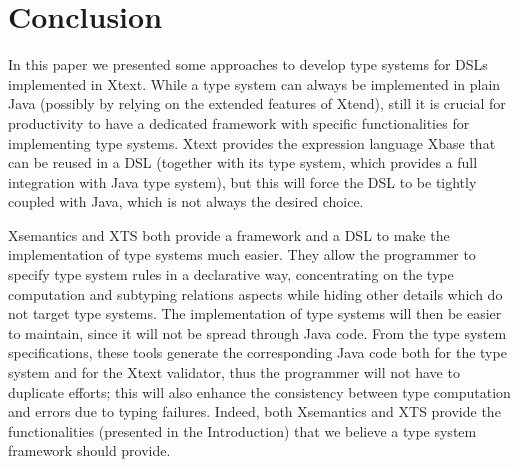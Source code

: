 \section{Conclusion}
\label{sec:conclusion}

In this paper we presented some approaches to develop type systems for DSLs
implemented in Xtext.  While a type system can always be implemented in plain
Java (possibly by relying on the extended features of Xtend), still it is
crucial for productivity to have a dedicated framework with specific
functionalities for implementing type systems.  Xtext provides the expression
language Xbase that can be reused in a DSL (together with its type system,
which provides a full integration with Java type system), but this will force
the DSL to be tightly coupled with Java, which is not always the desired choice.

Xsemantics and XTS both provide a framework and a DSL to make the implementation
of type systems much easier.  They allow the programmer to specify type system
rules in a declarative way, concentrating on the type computation and subtyping
relations aspects while hiding other details which do not target type systems.
The implementation of type systems will then be easier to maintain, since it
will not be spread through Java code.  From the type system specifications,
these tools generate the corresponding Java code both for the type system and
for the Xtext validator, thus the programmer will not have to duplicate efforts;
this will also enhance the consistency between type computation and errors due
to typing failures.  Indeed, both Xsemantics and XTS provide the functionalities
(presented in the Introduction) that we believe a type system framework should
provide.
